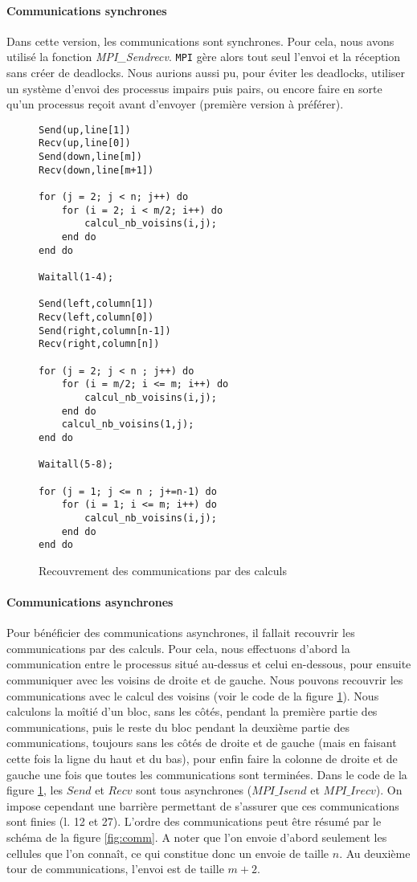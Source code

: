 \paragraph{Communications synchrones}
Dans cette version, les communications sont synchrones. Pour cela, nous avons utilisé la fonction \emph{MPI\_Sendrecv}. \texttt{MPI} gère alors tout seul l'envoi et la réception sans créer de deadlocks. Nous aurions aussi pu, pour éviter les deadlocks, utiliser un système d'envoi des processus impairs puis pairs, ou encore faire en sorte qu'un processus reçoit avant d'envoyer (première version à préférer). 

\begin{figure}[h!]
\begin{lstlisting}
Send(up,line[1])
Recv(up,line[0])
Send(down,line[m])
Recv(down,line[m+1])

for (j = 2; j < n; j++) do
	for (i = 2; i < m/2; i++) do
		calcul_nb_voisins(i,j);
	end do
end do

Waitall(1-4);

Send(left,column[1])
Recv(left,column[0])
Send(right,column[n-1])
Recv(right,column[n])

for (j = 2; j < n ; j++) do
	for (i = m/2; i <= m; i++) do
		calcul_nb_voisins(i,j);
	end do
	calcul_nb_voisins(1,j);
end do

Waitall(5-8);

for (j = 1; j <= n ; j+=n-1) do
	for (i = 1; i <= m; i++) do
		calcul_nb_voisins(i,j);
	end do
end do
\end{lstlisting}
\caption{Recouvrement des communications par des calculs}
\label{recouvrement}
\end{figure}


\paragraph{Communications asynchrones}
Pour bénéficier des communications asynchrones, il fallait recouvrir les communications par des calculs. Pour cela, nous effectuons d'abord la communication entre le processus situé au-dessus et celui en-dessous, pour ensuite communiquer avec les voisins de droite et de gauche. Nous pouvons recouvrir les communications avec le calcul des voisins (voir le code de la figure \ref{recouvrement}). Nous calculons la moîtié d'un bloc, sans les côtés, pendant la première partie des communications, puis le reste du bloc pendant la deuxième partie des communications, toujours sans les côtés de droite et de gauche (mais en faisant cette fois la ligne du haut et du bas), pour enfin faire la colonne de droite et de gauche une fois que toutes les communications sont terminées. Dans le code de la figure \ref{recouvrement}, les $Send$ et $Recv$ sont tous asynchrones ($MPI\_Isend$ et $MPI\_Irecv$). On impose cependant une barrière permettant de s'assurer que ces communications sont finies (l. 12 et 27). L'ordre des communications peut être résumé par le schéma de la figure \ref{fig:comm}. A noter que l'on envoie d'abord seulement les cellules que l'on connaît, ce qui constitue donc un envoie de taille $n$. Au deuxième tour de communications, l'envoi est de taille $m+2$.

